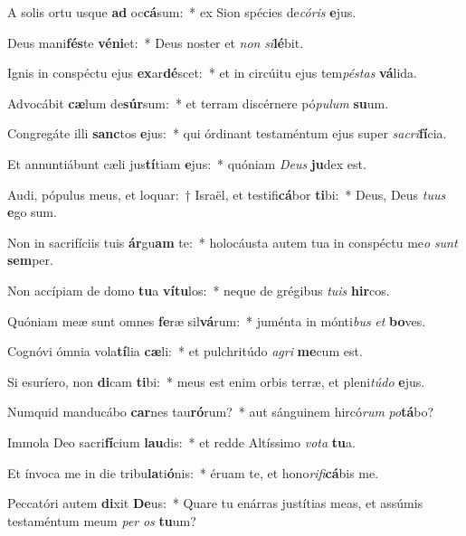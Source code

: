 \item A solis ortu usque \textbf{ad} oc\textbf{cá}sum:~* ex Sion spécies de\textit{có}\textit{ris} \textbf{e}jus.
\item Deus mani\textbf{fés}te \textbf{vé}\textbf{ni}et:~* Deus noster et \textit{non} \textit{si}\textbf{lé}bit.
\item Ignis in conspéctu ejus \textbf{ex}ar\textbf{dé}scet:~* et in circúitu ejus tem\textit{pés}\textit{tas} \textbf{vá}lida.
\item Advocábit \textbf{cæ}lum de\textbf{súr}sum:~* et terram discérnere pó\textit{pu}\textit{lum} \textbf{su}um.
\item Congregáte illi \textbf{sanc}tos \textbf{e}jus:~* qui órdinant testaméntum ejus super \textit{sa}\textit{cri}\textbf{fí}cia.
\item Et annuntiábunt cæli jus\textbf{tí}tiam \textbf{e}jus:~* quóniam \textit{De}\textit{us} \textbf{ju}dex est.
\item Audi, pópulus meus, et loquar:~† Israël, et testifi\textbf{cá}bor \textbf{ti}bi:~* Deus, Deus \textit{tu}\textit{us} \textbf{e}go sum.
\item Non in sacrifíciis tuis \textbf{ár}gu\textbf{am} te:~* holocáusta autem tua in conspéctu me\textit{o} \textit{sunt} \textbf{sem}per.
\item Non accípiam de domo \textbf{tu}a \textbf{ví}\textbf{tu}los:~* neque de grégibus \textit{tu}\textit{is} \textbf{hir}cos.
\item Quóniam meæ sunt omnes \textbf{fe}ræ sil\textbf{vá}rum:~* juménta in mónti\textit{bus} \textit{et} \textbf{bo}ves.
\item Cognóvi ómnia vola\textbf{tí}lia \textbf{cæ}li:~* et pulchritúdo \textit{a}\textit{gri} \textbf{me}cum est.
\item Si esuríero, non \textbf{di}cam \textbf{ti}bi:~* meus est enim orbis terræ, et pleni\textit{tú}\textit{do} \textbf{e}jus.
\item Numquid manducábo \textbf{car}nes tau\textbf{ró}rum?~* aut sánguinem hircó\textit{rum} \textit{po}\textbf{tá}bo?
\item Immola Deo sacri\textbf{fí}cium \textbf{lau}dis:~* et redde Altíssimo \textit{vo}\textit{ta} \textbf{tu}a.
\item Et ínvoca me in die tribu\textbf{la}ti\textbf{ó}nis:~* éruam te, et hono\textit{ri}\textit{fi}\textbf{cá}bis me.
\item Peccatóri autem \textbf{di}xit \textbf{De}us:~* Quare tu enárras justítias meas, et assúmis testaméntum meum \textit{per} \textit{os} \textbf{tu}um?
